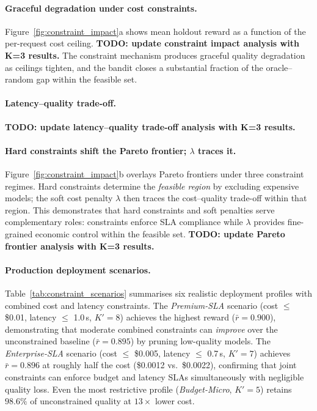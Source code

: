 \paragraph{Graceful degradation under cost constraints.}
Figure~\ref{fig:constraint_impact}a shows mean holdout reward as a function of the per-request cost ceiling.
\textbf{TODO: update constraint impact analysis with K=3 results.} The constraint mechanism produces graceful quality degradation as ceilings tighten, and the bandit closes a substantial fraction of the oracle--random gap within the feasible set.

\paragraph{Latency--quality trade-off.}
\textbf{TODO: update latency--quality trade-off analysis with K=3 results.}

\paragraph{Hard constraints shift the Pareto frontier; $\lambda$ traces it.}
Figure~\ref{fig:constraint_impact}b overlays Pareto frontiers under three constraint regimes.
Hard constraints determine the \emph{feasible region} by excluding expensive models; the soft cost penalty $\lambda$ then traces the cost--quality trade-off within that region.
This demonstrates that hard constraints and soft penalties serve complementary roles: constraints enforce SLA compliance while $\lambda$ provides fine-grained economic control within the feasible set.
\textbf{TODO: update Pareto frontier analysis with K=3 results.}


\paragraph{Production deployment scenarios.}
Table~\ref{tab:constraint_scenarios} summarises six realistic deployment profiles with combined cost and latency constraints.
The \emph{Premium-SLA} scenario (cost $\leq$ \$0.01, latency $\leq$ 1.0\,s, $K'{=}8$) achieves the highest reward ($\bar{r}{=}0.900$), demonstrating that moderate combined constraints can \emph{improve} over the unconstrained baseline ($\bar{r}{=}0.895$) by pruning low-quality models.
The \emph{Enterprise-SLA} scenario (cost $\leq$ \$0.005, latency $\leq$ 0.7\,s, $K'{=}7$) achieves $\bar{r}{=}0.896$ at roughly half the cost (\$0.0012 vs.\ \$0.0022), confirming that joint constraints can enforce budget and latency SLAs simultaneously with negligible quality loss.
Even the most restrictive profile (\emph{Budget-Micro}, $K'{=}5$) retains $98.6\%$ of unconstrained quality at $13\times$ lower cost.

